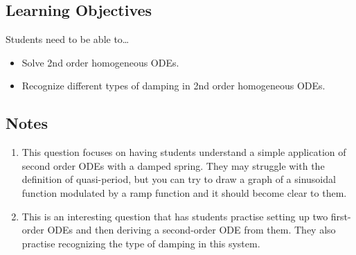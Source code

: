 \subsection*{Learning Objectives}
Students need to be able to\ldots
\begin{itemize}
	\item Solve 2nd order homogeneous ODEs.
    \item Recognize different types of damping in 2nd order homogeneous ODEs.
\end{itemize}

\subsection*{Notes}
	\begin{enumerate}
		\item This question focuses on having students understand a simple application of second order ODEs with a damped spring. They may struggle with the definition of quasi-period, but you can try to draw a graph of a sinusoidal function modulated by a ramp function and it should become clear to them.

        \item This is an interesting question that has students practise setting up two first-order ODEs and then deriving a second-order ODE from them. They also practise recognizing the type of damping in this system.
	\end{enumerate}






